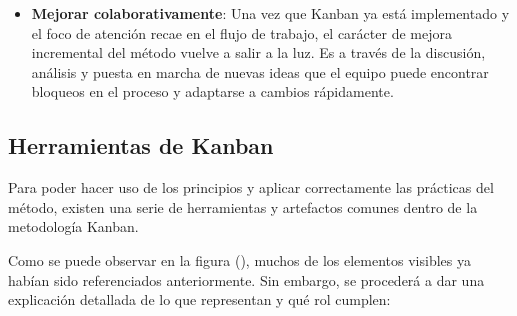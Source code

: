 \begin{itemize}
    \item \textbf{Mejorar colaborativamente}: %
    Una vez que Kanban ya está implementado y el foco de atención recae en el
    flujo de trabajo, el carácter de mejora incremental del método vuelve a
    salir a la luz. Es a través de la discusión, análisis y puesta en marcha de
    nuevas ideas que el equipo puede encontrar bloqueos en el proceso y
    adaptarse a cambios rápidamente.
\end{itemize}

\subsection{Herramientas de Kanban}

Para poder hacer uso de los principios y aplicar correctamente las prácticas del
método, existen una serie de herramientas y artefactos comunes dentro de la
metodología Kanban.


Como se puede observar en la figura (), muchos de los elementos visibles ya
habían sido referenciados anteriormente. Sin embargo, se procederá a dar una
explicación detallada de lo que representan y qué rol cumplen:

